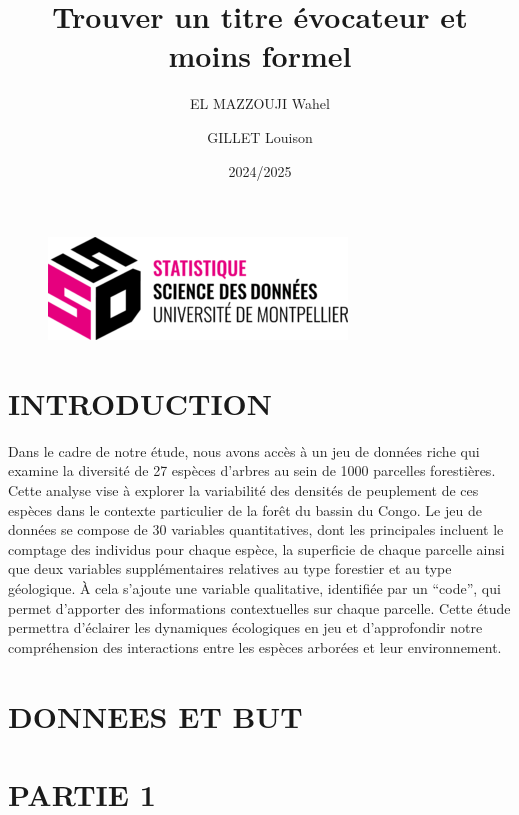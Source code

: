\documentclass[
]{article}
\title{Trouver un titre évocateur et moins formel}
\author{EL MAZZOUJI Wahel \and GILLET Louison}
\date{2024/2025}
\begin{document}
\maketitle

\begin{figure}[h!]
    \centering
    \includegraphics[width=0.5\linewidth]{ssd.png}
\end{figure}

\newpage

\tableofcontents

\newpage

\hypertarget{introduction}{%
\section{INTRODUCTION}\label{introduction}}

Dans le cadre de notre étude, nous avons accès à un jeu de données riche
qui examine la diversité de 27 espèces d'arbres au sein de 1000
parcelles forestières. Cette analyse vise à explorer la variabilité des
densités de peuplement de ces espèces dans le contexte particulier de la
forêt du bassin du Congo. Le jeu de données se compose de 30 variables
quantitatives, dont les principales incluent le comptage des individus
pour chaque espèce, la superficie de chaque parcelle ainsi que deux
variables supplémentaires relatives au type forestier et au type
géologique. À cela s'ajoute une variable qualitative, identifiée par un
``code'', qui permet d'apporter des informations contextuelles sur
chaque parcelle. Cette étude permettra d'éclairer les dynamiques
écologiques en jeu et d'approfondir notre compréhension des interactions
entre les espèces arborées et leur environnement.

\hypertarget{donnees-et-but}{%
\section{DONNEES ET BUT}\label{donnees-et-but}}

\hypertarget{partie-1}{%
\section{PARTIE 1}\label{partie-1}}
\end{document}
